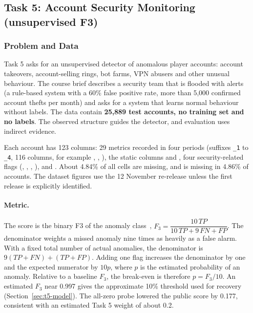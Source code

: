 \documentclass[../main.tex]{subfiles}
\begin{document}
\graphicspath{{figures/}{task5/figures/}}
\begingroup
\captionsetup[table]{justification=raggedright,singlelinecheck=false}

\subsection{Task 5: Account Security Monitoring (unsupervised F3)}
\label{sec:t5}

\subsubsection{Problem and Data}

Task 5 asks for an unsupervised detector of anomalous player accounts: account takeovers, account-selling rings, bot farms, VPN abusers and other unusual behaviour. The course brief describes a security team that is flooded with alerts (a rule-based system with a 60\% false positive rate, more than 5,000 confirmed account thefts per month) and asks for a system that learns normal behaviour without labels. The data contain \textbf{25,889 test accounts, no training set and no labels}. The observed structure guides the detector, and evaluation uses indirect evidence.

Each account has 123 columns: 29 metrics recorded in four periods (suffixes \texttt{\_1} to \texttt{\_4}, 116 columns, for example , , ), the static columns  and , four security-related flags (, , , ), and . About 4.84\% of all cells are missing, and  is missing in 4.86\% of accounts. The dataset figures use the 12 November re-release unless the first release is explicitly identified.

\paragraph{Metric.} The score is the binary F3 of the anomaly class~\citep{fbeta}, $F_3 = \dfrac{10\,TP}{10\,TP + 9\,FN + FP}$. The denominator weights a missed anomaly nine times as heavily as a false alarm. With a fixed total number of actual anomalies, the denominator is $9(TP+FN)+(TP+FP)$. Adding one flag increases the denominator by one and the expected numerator by $10p$, where $p$ is the estimated probability of an anomaly. Relative to a baseline $F_3$, the break-even is therefore $p=F_3/10$. An estimated $F_3$ near 0.997 gives the approximate 10\% threshold used for recovery (Section~\ref{sec:t5-model}). The all-zero probe lowered the public score by 0.177, consistent with an estimated Task 5 weight of about 0.2.
\end{document}
